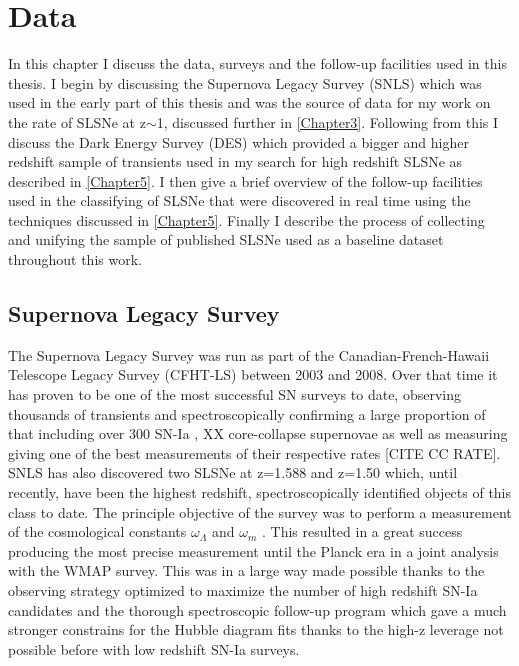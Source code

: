 
\chapter{Data} %
\label{Chapter2}

In this chapter I discuss the data, surveys and the follow-up facilities used in this thesis. I begin by discussing the Supernova Legacy Survey (SNLS) which was used in the early part of this thesis and was the source of data for my work on the rate of SLSNe at z$\sim$1, discussed further in \cref{Chapter3}. Following from this I discuss the Dark Energy Survey (DES) which provided a bigger and higher redshift sample of transients used in my search for high redshift SLSNe as described in \cref{Chapter5}. I then give a brief overview of the follow-up facilities used in the classifying of SLSNe that were discovered in real time using the techniques discussed in \cref{Chapter5}. Finally I describe the process of collecting and unifying the sample of published SLSNe used as a baseline dataset throughout this work.

\section{Supernova Legacy Survey}
The Supernova Legacy Survey \citep{Boulade2003MegaCam:Camera,Pritchet2004SNLSSurvey} was run as part of the Canadian-French-Hawaii Telescope Legacy Survey (CFHT-LS) between 2003 and 2008. Over that time it has proven to be one of the most successful SN surveys to date, observing thousands of transients and spectroscopically confirming a large proportion of that including over 300 SN-Ia \citep{Perrett2010Real-timeSurvey}, XX core-collapse supernovae as well as measuring giving one of the best measurements of their respective rates \citep{Perrett2012EVOLUTIONSURVEY} [CITE CC RATE]. SNLS has also discovered two SLSNe at z=1.588 and z=1.50 \citep{Howell2013TwoSurvey} which, until recently, have been the highest redshift, spectroscopically identified objects of this class to date. The principle objective of the survey was to perform a measurement of the cosmological constants $\omega_{\Lambda}$ and $\omega_{m}$ \citep{Sullivan2011SNLS3:PROBES,Astier2013PhotometrySNLS}. This resulted in a great success producing the most precise measurement until the Planck era in a joint analysis with the WMAP survey. This was in a large way made possible thanks to the observing strategy optimized to maximize the number of high redshift SN-Ia candidates and the thorough spectroscopic follow-up program which gave a much stronger constrains for the Hubble diagram fits thanks to the high-z leverage not possible before with low redshift SN-Ia surveys.

